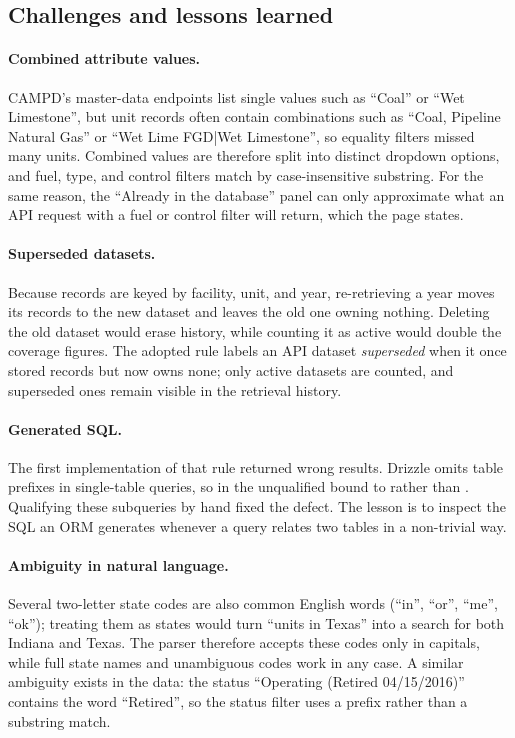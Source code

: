 \documentclass[11pt,a4paper]{article}
\begin{document}
\subsection{Challenges and lessons learned}
\label{sec:challenges}

\paragraph{Combined attribute values.} CAMPD's master-data endpoints list single values such
as ``Coal'' or ``Wet Limestone'', but unit records often contain combinations such as ``Coal,
Pipeline Natural Gas'' or ``Wet Lime FGD|Wet Limestone'', so equality filters missed many
units. Combined values are therefore split into distinct dropdown options, and fuel, type, and
control filters match by case-insensitive substring. For the same reason, the ``Already in the
database'' panel can only approximate what an API request with a fuel or control filter will
return, which the page states.

\paragraph{Superseded datasets.} Because records are keyed by facility, unit, and year,
re-retrieving a year moves its records to the new dataset and leaves the old one owning
nothing. Deleting the old dataset would erase history, while counting it as active would double
the coverage figures. The adopted rule labels an API dataset \emph{superseded} when it once
stored records but now owns none; only active datasets are counted, and superseded ones remain
visible in the retrieval history.

\paragraph{Generated SQL.} The first implementation of that rule returned wrong results.
Drizzle omits table prefixes in single-table queries, so in  the unqualified
 bound to  rather than . Qualifying these
subqueries by hand fixed the defect. The lesson is to inspect the SQL an ORM generates whenever
a query relates two tables in a non-trivial way.

\paragraph{Ambiguity in natural language.} Several two-letter state codes are also common
English words (``in'', ``or'', ``me'', ``ok''); treating them as states would turn ``units in
Texas'' into a search for both Indiana and Texas. The parser therefore accepts these codes only
in capitals, while full state names and unambiguous codes work in any case. A similar ambiguity
exists in the data: the status ``Operating (Retired 04/15/2016)'' contains the word
``Retired'', so the status filter uses a prefix rather than a substring match.
\end{document}
